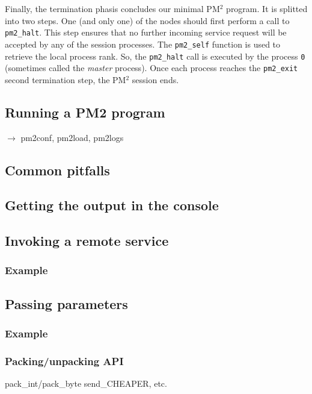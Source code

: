 \documentclass[a4paper,11pt]{article}
\def\pm2{PM$^2$\xspace}
\begin{document}
Finally, the termination phasis concludes our minimal \pm2 program. It
is splitted into two steps. One (and only one) of the nodes should
first perform a call to \texttt{pm2\_halt}. This step ensures that no
further incoming service request will be accepted by any of the
session processes. The \texttt{pm2\_self} function is used to retrieve
the local process rank. So, the \texttt{pm2\_halt} call is executed by
the process \texttt{0} (sometimes called the \emph{master} process).
Once each process reaches the \texttt{pm2\_exit} second termination
step, the \pm2 session ends.

\subsection{Running a PM2 program}
        $\rightarrow$ pm2conf, pm2load, pm2logs

\subsection{Common pitfalls}

\subsection{Getting the output in the console}

\subsection{Invoking a remote service}

\subsubsection{Example}

\subsection{Passing parameters}

\subsubsection{Example}

\subsubsection{Packing/unpacking API}
        pack\_int/pack\_byte
        send\_CHEAPER, etc.
\end{document}
